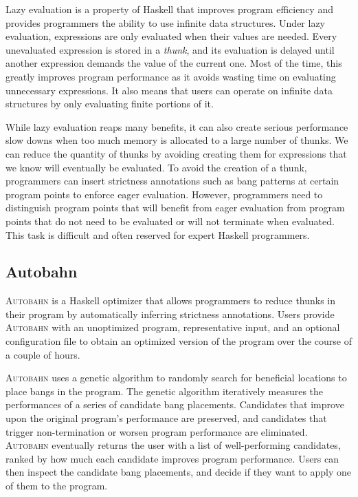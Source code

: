 \documentclass[format=sigplan, review=true]{acmart}
\begin{document}
Lazy evaluation is a property of Haskell that improves program efficiency and provides programmers the ability to use infinite data structures. Under lazy evaluation, expressions are only evaluated when their values are needed. Every unevaluated expression is stored in a \textit{thunk}, and its evaluation is delayed until another expression demands the value of the current one. Most of the time, this greatly improves program performance as it avoids wasting time on evaluating unnecessary expressions. It also means that users can operate on infinite data structures by only evaluating finite portions of it.

While lazy evaluation reaps many benefits, it can also create serious performance slow downs when too much memory is allocated to a large number of thunks. We can reduce the quantity of thunks by avoiding creating them for expressions that we know will eventually be evaluated. To avoid the creation of a thunk, programmers can insert strictness annotations such as bang patterns at certain program points to enforce eager evaluation. However, programmers need to distinguish program points that will benefit from eager evaluation from program points that do not need to be evaluated or will not terminate when evaluated. This task is difficult and often reserved for expert Haskell programmers. 

\subsection{Autobahn}

\textsc{Autobahn} is a Haskell optimizer that allows programmers to reduce thunks in their program by automatically inferring strictness annotations. Users provide \textsc{Autobahn} with an unoptimized program, representative input, and an optional configuration file to obtain an optimized version of the program over the course of a couple of hours. 

\textsc{Autobahn} uses a genetic algorithm to randomly search for beneficial locations to place bangs in the program. The genetic algorithm iteratively measures the performances of a series of candidate bang placements. Candidates that improve upon the original program's performance are preserved, and candidates that trigger non-termination or worsen program performance are eliminated. \textsc{Autobahn} eventually returns the user with a list of well-performing candidates, ranked by how much each candidate improves program performance. Users can then inspect the candidate bang placements, and decide if they want to apply one of them to the program.
\end{document}
